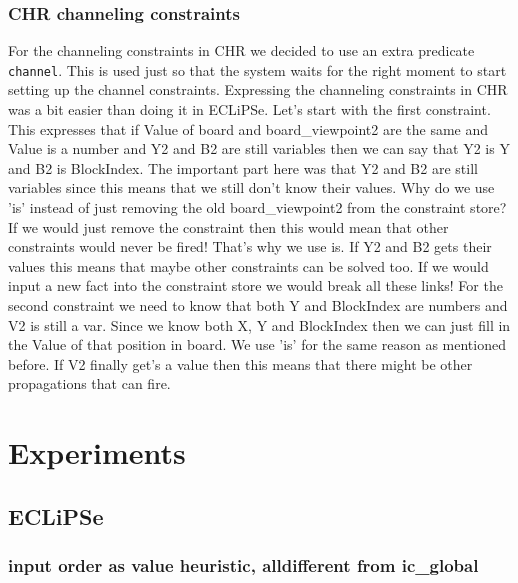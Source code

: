 \documentclass{report}
\begin{document}
\subsubsection{CHR channeling constraints}

For the channeling constraints in CHR we decided to use an extra predicate \texttt{channel}. This is used just so that the system waits for the right moment to start setting up the channel constraints. Expressing the channeling constraints in CHR was a bit easier than doing it in ECLiPSe. Let's start with the first constraint. This expresses that if Value of board and board\_viewpoint2 are the same and Value is a number and Y2 and B2 are still variables then we can say that Y2 is Y and B2 is BlockIndex. The important part here was that Y2 and B2 are still variables since this means that we still don't know their values. Why do we use 'is' instead of just removing the old board\_viewpoint2 from the constraint store? If we would just remove the constraint then this would mean that other constraints would never be fired! That's why we use is. If Y2 and B2 gets their values this means that maybe other constraints can be solved too. If we would input a new fact into the constraint store we would break all these links!
\newline
\newline
For the second constraint we need to know that both Y and BlockIndex are numbers and V2 is still a var. Since we know both X, Y and BlockIndex then we can just fill in the Value of that position in board. We use 'is' for the same reason as mentioned before. If V2 finally get's a value then this means that there might be other propagations that can fire.
\newpage
\section{Experiments}
\subsection{ECLiPSe}
\subsubsection{input order as value heuristic, alldifferent from ic\_global}
\end{document}
